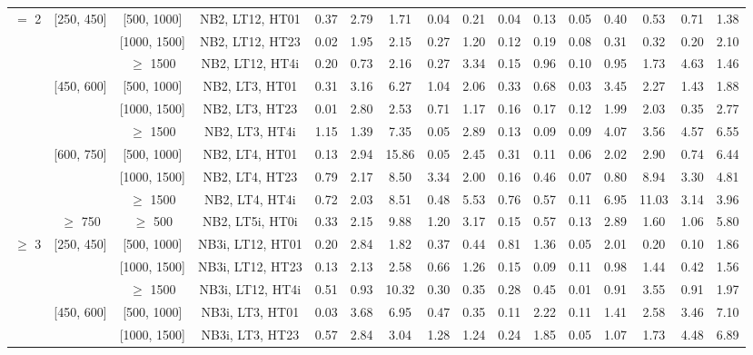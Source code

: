 \begin{sidewaystable}[ht]
\begin{center}
\begin{tabular}{|c | c | c | c | c | c | c | c | c | c | c | c | c | c | c | c | }
\cline{1-16} $=$ 2 & [250, 450] & [500, 1000]&NB2, LT12, HT01 & 0.37 & 2.79 & 1.71 & 0.04 & 0.21 & 0.04 & 0.13 & 0.05 & 0.40 & 0.53 & 0.71 & 1.38 \\ 
\cline{3-16}  & & [1000, 1500] &NB2, LT12, HT23 & 0.02 & 1.95 & 2.15 & 0.27 & 1.20 & 0.12 & 0.19 & 0.08 & 0.31 & 0.32 & 0.20 & 2.10 \\ 
\cline{3-16}  & & $\geq$ 1500 &NB2, LT12, HT4i & 0.20 & 0.73 & 2.16 & 0.27 & 3.34 & 0.15 & 0.96 & 0.10 & 0.95 & 1.73 & 4.63 & 1.46 \\ 
\cline{2-16}   & [450, 600] & [500, 1000]&NB2, LT3, HT01 & 0.31 & 3.16 & 6.27 & 1.04 & 2.06 & 0.33 & 0.68 & 0.03 & 3.45 & 2.27 & 1.43 & 1.88 \\ 
\cline{3-16}  & & [1000, 1500] &NB2, LT3, HT23 & 0.01 & 2.80 & 2.53 & 0.71 & 1.17 & 0.16 & 0.17 & 0.12 & 1.99 & 2.03 & 0.35 & 2.77 \\ 
\cline{3-16}  & & $\geq$ 1500 &NB2, LT3, HT4i & 1.15 & 1.39 & 7.35 & 0.05 & 2.89 & 0.13 & 0.09 & 0.09 & 4.07 & 3.56 & 4.57 & 6.55 \\ 
\cline{2-16}   & [600, 750] & [500, 1000]&NB2, LT4, HT01 & 0.13 & 2.94 & 15.86 & 0.05 & 2.45 & 0.31 & 0.11 & 0.06 & 2.02 & 2.90 & 0.74 & 6.44 \\ 
\cline{3-16}  & & [1000, 1500] &NB2, LT4, HT23 & 0.79 & 2.17 & 8.50 & 3.34 & 2.00 & 0.16 & 0.46 & 0.07 & 0.80 & 8.94 & 3.30 & 4.81 \\ 
\cline{3-16}  & & $\geq$ 1500 &NB2, LT4, HT4i & 0.72 & 2.03 & 8.51 & 0.48 & 5.53 & 0.76 & 0.57 & 0.11 & 6.95 & 11.03 & 3.14 & 3.96 \\ 
\cline{2-16}   & $\geq$ 750 & $\geq$ 500&NB2, LT5i, HT0i & 0.33 & 2.15 & 9.88 & 1.20 & 3.17 & 0.15 & 0.57 & 0.13 & 2.89 & 1.60 & 1.06 & 5.80 \\ 
\cline{1-16} $\geq$ 3 & [250, 450] & [500, 1000]&NB3i, LT12, HT01 & 0.20 & 2.84 & 1.82 & 0.37 & 0.44 & 0.81 & 1.36 & 0.05 & 2.01 & 0.20 & 0.10 & 1.86 \\ 
\cline{3-16}  & & [1000, 1500] &NB3i, LT12, HT23 & 0.13 & 2.13 & 2.58 & 0.66 & 1.26 & 0.15 & 0.09 & 0.11 & 0.98 & 1.44 & 0.42 & 1.56 \\ 
\cline{3-16}  & & $\geq$ 1500 &NB3i, LT12, HT4i & 0.51 & 0.93 & 10.32 & 0.30 & 0.35 & 0.28 & 0.45 & 0.01 & 0.91 & 3.55 & 0.91 & 1.97 \\ 
\cline{2-16}   & [450, 600] & [500, 1000]&NB3i, LT3, HT01 & 0.03 & 3.68 & 6.95 & 0.47 & 0.35 & 0.11 & 2.22 & 0.11 & 1.41 & 2.58 & 3.46 & 7.10 \\ 
\cline{3-16}  & & [1000, 1500] &NB3i, LT3, HT23 & 0.57 & 2.84 & 3.04 & 1.28 & 1.24 & 0.24 & 1.85 & 0.05 & 1.07 & 1.73 & 4.48 & 6.89 \\ 

\end{tabular}
\end{center}
\end{sidewaystable}
